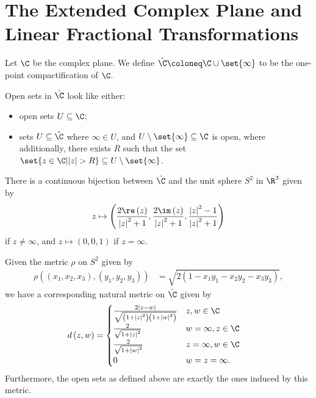 \documentclass[10pt]{mypackage}
\begin{document}
\RaggedRight
\section{The Extended Complex Plane and Linear Fractional Transformations}%
\begin{definition}
  Let $\C$ be the complex plane. We define $\hat{\C} \coloneq \C\cup\set{\infty}$ to be the one-point compactification of $\C$.\newline

  Open sets in $\hat{\C}$ look like either:
  \begin{itemize}
    \item open sets $U\subseteq \C$;
    \item sets $U\subseteq \hat{\C}$ where $\infty\in U$, and $U\setminus\set{\infty}\subseteq \C$ is open, where additionally, there exists $R$ such that the set $\set{z\in \C | |z| > R}\subseteq U\setminus \set{\infty}$.
  \end{itemize}
\end{definition}
\begin{proposition}
  There is a continuous bijection between $\hat{\C}$ and the unit sphere $S^{2}$ in $\R^3$ given by
  \begin{align*}
    z \mapsto \left( \frac{2\re\left( z \right)}{\left\vert z \right\vert^2+1},\frac{2\im\left( z \right)}{\left\vert z \right\vert^2 + 1}, \frac{\left\vert z \right\vert^2-1}{\left\vert z \right\vert^2+1} \right)
  \end{align*}
  if $z\neq \infty$, and $z\mapsto \left( 0,0,1 \right)$ if $z = \infty$.
\end{proposition}
\begin{proposition}
  Given the metric $\rho$ on $S^{2}$ given by
  \begin{align*}
    \rho\left( \left( x_1,x_2,x_3 \right),\left( y_1,y_2,y_3 \right) \right) &= \sqrt{2\left( 1-x_1y_1-x_2y_2-x_3y_3 \right)},
  \end{align*}
  we have a corresponding natural metric on $\hat{\C}$ given by
  \begin{align*}
    d\left( z,w \right) &= \begin{cases}
      \frac{2\left\vert z-w \right\vert}{\sqrt{\left( 1+\left\vert z \right\vert^2 \right)\left( 1 + \left\vert w \right\vert^2 \right)}} & z,w\in \C\\
      \frac{2}{\sqrt{1 + \left\vert z \right\vert^2}}& w = \infty,z\in \C\\
      \frac{2}{\sqrt{1 + \left\vert w \right\vert^2}} & z=\infty,w\in\C\\
      0 & w=z=\infty.
    \end{cases}
  \end{align*}
  Furthermore, the open sets as defined above are exactly the ones induced by this metric.
\end{proposition}
\end{document}
